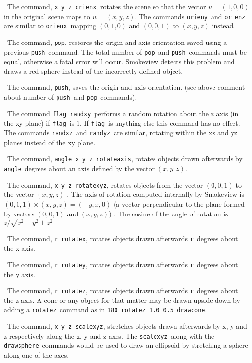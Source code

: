 \documentclass[11pt,twoside]{book}
\newcommand{\hitem}[1]{\item[{\bf #1} \hfill]}
\begin{document}
\hitem{orienx, orieny, orienz}\ The command, {\tt x y z orienx}, rotates
the scene so that the vector $u=(1,0,0)$ in the
original scene maps to $w=(x,y,z)$. The commands {\tt orieny}\ and {\tt orienz}
are similar to {\tt orienx}\ mapping $(0,1,0)$ and
$(0,0,1)$ to $(x,y,z)$ instead.

\hitem{pop}\ The command, {\tt pop}, restores the origin and axis orientation
saved using a previous {\tt push}\ command.  The total
number of {\tt pop}\ and {\tt push}\ commands must be equal, otherwise a
fatal error will occur.  Smokeview detects this problem and draws a red
sphere instead of the incorrectly defined object.

\hitem{push}\ The command, {\tt push}, saves the origin and axis orientation.
(see above comment about number of {\tt push}\ and
{\tt pop}\ commands).

\hitem{randxy, randxz, randyz}\ The command {\tt flag randxy}\ performs a
random rotation about the z axis (in the xy plane) if
{\tt flag}\ is 1. If {\tt flag}\ is anything else this command has no effect.
The commands {\tt randxz}\ and {\tt randyz}\ are similar,
rotating within the xz and yz planes instead of the xy plane.

\hitem{rotateaxis}\ The command, {\tt angle x y z rotateaxis}, rotates objects
drawn afterwards by {\tt angle}\ degrees about an
axis defined by the vector $(x,y,z)$.

\hitem{rotatexyz}\ The command, {\tt x y z rotatexyz}, rotates objects from the
vector $(0,0,1)$ to the vector $(x,y,z)$ .  The
axis of rotation computed internally by Smokeview is $(0,0,1)\times
(x,y,z)=(-y,x,0)$ (a vector perpendicular to the plane formed by vectors
$(0,0,1)$ and $(x,y,z)$) . The cosine of the angle of rotation is $z/\sqrt{x^2+y^2+z^2}$

\hitem{rotatex}\ The command, {\tt r rotatex}, rotates objects drawn afterwards
{\tt r}\ degrees about the x axis.

\hitem{rotatey}\ The command, {\tt r rotatey}, rotates objects drawn afterwards
{\tt r}\ degrees about the y axis.

\hitem{rotatez}\ The command, {\tt r rotatez}, rotates objects drawn afterwards
{\tt r}\ degrees about the z axis.  A cone or any
object for that matter may be drawn upside down by adding a {\tt rotatez}\
command as in {\tt 180 rotatez 1.0 0.5 drawcone}.

\hitem{scalexyz}\ The command, {\tt x y z scalexyz}, stretches objects drawn
afterwards by x, y and z respectively along the x, y
and z axes. The {\tt scalexyz}\ along with the {\tt drawsphere}\ commands
would be used to draw an ellipsoid by stretching a sphere
along one of the axes.
\end{document}
